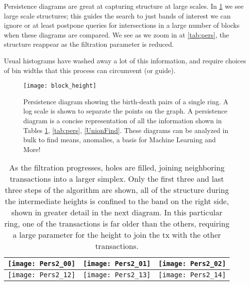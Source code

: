 Persistence diagrams are great at capturing structure at large scales.  In \ref{tab:pers2} we see large scale structures; this guides the search to just bands of interest we can ignore or at least postpone queries for intersections in a large number of blocks when these diagrams are compared.  We see as we zoom in at \ref{tab:pers}, the structure reappear as the filtration parameter is reduced.  

Usual histograms have washed away a lot of this information, and require choices of bin widths that this process can circumvent (or guide).  


\begin{figure}[h]
\texttt{[image: block\_height]}
\caption{Persistence diagram showing the birth-death pairs of a single ring.  A log scale is shown to separate the points on the graph.  A persistence diagram is a concise representation of all the information shown in Tables \ref{tab:pers2}, \ref{tab:pers}, \ref{UnionFind}.  These diagrams can be analyzed in bulk to find means, anomalies, a basis for Machine Learning and More!}
\label{fig:alpha}
\end{figure}

\begin{center}
\begin{table}
\begin{tabular}{|c|c|c|}

\hline
 \texttt{[image: Pers2\_00]} & \texttt{[image: Pers2\_01]} & \texttt{[image: Pers2\_02]} \\ \hline
  \texttt{[image: Pers2\_12]} & \texttt{[image: Pers2\_13]} & \texttt{[image: Pers2\_14]} \\ \hline
\end{tabular}
\caption{As the filtration progresses, holes are filled, joining neighboring transactions into a larger simplex.  Only the first three and last three steps of the algorithm are shown, all of the structure during the intermediate heights is confined to the band on the right side, shown in greater detail in the next diagram. 
In this particular ring, one of the transactions is far older than the others, requiring a large parameter for the height to join the tx with the other transactions.}
\label{tab:pers2}
\end{table}
\end{center}

